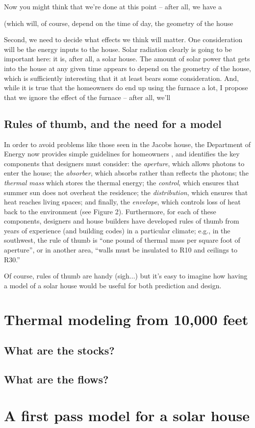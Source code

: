 \documentclass[10pt]{book}
\begin{document}
Now you might think that we're done at this point -- after all, we have a 


 (which will, of course, depend on the time of day, the geometry of the house

Second, we need to decide what effects we think will matter.  One consideration will be the energy inputs to the house.  Solar radiation clearly  is going to be important here:  it is, after all, a solar house.  The amount of solar power that gets into the house at any given time appears to depend on the geometry of the house, which is sufficiently interesting that it at least bears some consideration.   And, while it is true that the homeowners do end up using the furnace a lot, I propose that we ignore the effect of the furnace -- after all, we'll 

\subsection{Rules of thumb, and the need for a model}

In order to avoid problems like those seen in the Jacobs house, the
Department of Energy now provides simple guidelines for
homeowners
\cite{EERE}, and identifies the key components that
designers must consider: the {\em aperture}, which allows photons to
enter the house; the {\em absorber}, which absorbs rather than
reflects the photons; the {\em thermal mass} which stores the thermal
energy; the {\em control}, which ensures that summer sun does not
overheat the residence; the {\em distribution}, which ensures that
heat reaches living spaces; and finally, the {\em envelope}, which
controls loss of heat back to the environment (see Figure 2).
Furthermore, for each of these components, designers and house
builders have developed rules of thumb from years of experience (and
building codes) in a particular climate; e.g., in the southwest, the
rule of thumb is ``one pound of thermal mass per square foot of
aperture'', or in another area, ``walls must be insulated to R10 and
ceilings to R30.''


Of course, rules of thumb are handy (sigh...) but it's easy to imagine how having a model of a solar house would be useful for both prediction and design.

\section{Thermal modeling from 10,000 feet}

\subsection{What are the stocks?}

\subsection{What are the flows?}

\section{A first pass model for a solar house}
\end{document}
